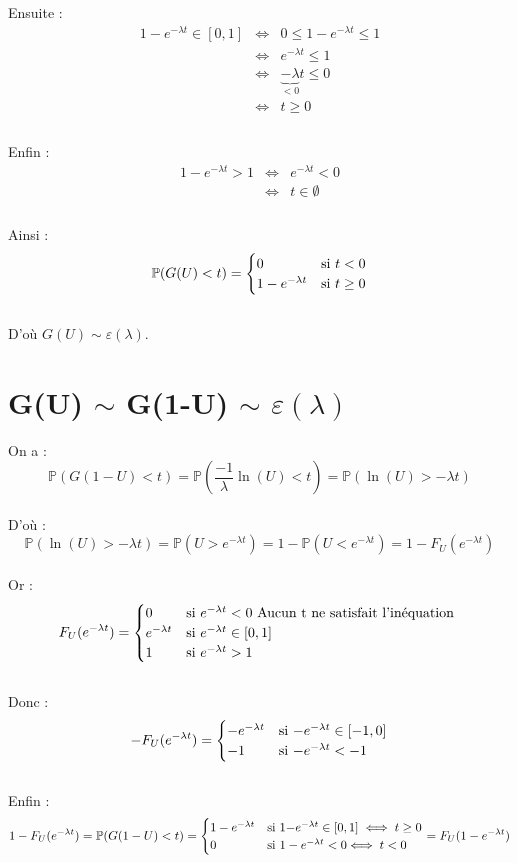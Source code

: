 \documentclass[12,french]{report}
\begin{document}
Ensuite :
$$\begin{array}{ccl}
	1-e^{-\lambda t}\in[0,1] & \iff & 0\leq1-e^{-\lambda t}\leq1 \\
					   & \iff & e^{-\lambda t}\leq1 \\
					   & \iff & \underbrace{-\lambda}_{<0}t\leq0 \\
					   & \iff & t\geq0 \\
\end{array}$$\\

Enfin :
$$\begin{array}{ccl}
	1-e^{-\lambda t}>1 & \iff & e^{-\lambda t}<0 \\
	& \iff & t\in\emptyset \\
  \end{array}$$\\
  
Ainsi :
$$\mathbb{P}(G(U)<t)=\begin{cases}
0 & \text{si \ensuremath{t<0}}\\
1-e^{-\lambda t} & \text{si }t\geq0
\end{cases}$$\\

D'où $G(U) \sim \varepsilon(\lambda)$.
 
\section{G(U) $\sim$ G(1-U) $\sim$ $\varepsilon(\lambda)$}

On a :
$$\mathbb{P}(G(1-U)<t)=\mathbb{P}(\frac{-1}{\lambda}\ln(U)<t)=\mathbb{P}(\ln(U)>-\lambda t)$$\\
D'où : $$\mathbb{P}(\ln(U)>-\lambda t)=\mathbb{P}(U>e^{-\lambda t})=1-\mathbb{P}(U<e^{-\lambda t})=1-F_{U}(e^{-\lambda t})$$\\

Or : $$F_{U}(e^{-\lambda t})=\begin{cases}
0 & \text{si \ensuremath{e^{-\lambda t}<0}}\text{ Aucun t ne satisfait l'inéquation }\\
e^{-\lambda t} & \text{si \ensuremath{e^{-\lambda t}}}\in[0,1]\\
1 & \text{si \ensuremath{e^{-\lambda t}>1}}
\end{cases}$$\\
Donc :
$$-F_{U}(e^{-\lambda t})=\begin{cases}
-e^{-\lambda t} & \text{si \ensuremath{-}\ensuremath{e^{-\lambda t}}}\in[-1,0]\\
-1 & \text{si \ensuremath{-e^{-\lambda t}<-1}}
\end{cases}$$\\
Enfin :
$$1-F_{U}(e^{-\lambda t})=\mathbb{P}(G(1-U)<t)=\begin{cases}
1-e^{-\lambda t} & \text{si \ensuremath{1-}\ensuremath{e^{-\lambda t}}}\in[0,1]\iff t\geq0\\
0 & \text{si \ensuremath{1-e^{-\lambda t}<0}\ensuremath{\iff t<0}}
\end{cases}=F_{U}(1-e^{-\lambda t})$$\\
\end{document}

